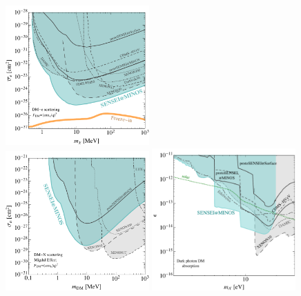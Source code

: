 \documentclass[aps,prl,twocolumn,showpacs,superscriptaddress,preprintnumbers]{revtex4-1}
\begin{document}
\begin{nolinenumbers}
\begin{figure}
{\begin{minipage}{0.67\textwidth}
\begin{center}
 \includegraphics[width=0.49\textwidth]{SENSEI_MINOS2020_FDMq2-Paper.pdf}\\
\includegraphics[width=0.49\textwidth]{SENSEI_MINOS2020_Migdal_FDMq2-Paper.pdf}
\includegraphics[width=0.49\textwidth]{absorption_rho03_3pt8_v4.pdf}
\end{center}
\end{minipage}
}
\end{figure}
%
\end{nolinenumbers}
\end{document}
